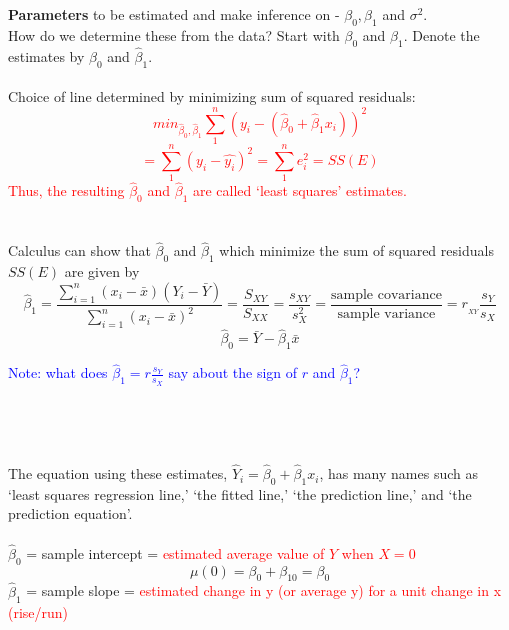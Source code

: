 \Large\textbf{Parameters} to be estimated and make inference on - $\beta_0, \beta_1$ and $\sigma^2$.\large\\
How do we determine these from the data?  Start with $\beta_0$ and $\beta_1$.  Denote the estimates by $\hat\beta_0$ and $\hat\beta_1$.\\~\\
Choice of line determined by minimizing sum of squared residuals:%
\textcolor{red}{$$min_{\hat\beta_0,\hat\beta_1}\sum_1^n \left(y_i- (\hat\beta_0 + \hat\beta_1 x_i)\right)^2$$
$$ = \sum_1^n (y_i-\hat{y_i})^2 = \sum_1^n e_i^2 = SS(E)$$
Thus, the resulting $\hat\beta_0$ and $\hat\beta_1$ are called `least squares' estimates.}\\~\\~\\
Calculus can show that $\hat\beta_0$ and $\hat\beta_1$ which minimize the sum of squared residuals $SS(E)$ are given by
$$\hat{\beta}_1=\frac{\sum_{i=1}^{n} (x_i-\bar{x})(Y_i-\bar{Y})}{\sum_{i=1}^{n} (x_i-\bar{x})^2}= \frac{S_{XY}}{S_{XX}} = \frac{s_{XY}}{s_X^2} = \frac{\mbox{sample covariance}}{\mbox{sample variance}} = r_{_{XY}} \frac{s_Y}{s_X}$$
$$\hat{\beta}_0=\bar{Y}-\hat{\beta}_1 \bar{x}$$

\textcolor{blue}{Note: what does $\hat{\beta}_1= r\frac{s_Y}{s_X} $ say about the sign of $r$ and $\hat{\beta}_1$?}\\~\\~\\~\\~\\

The equation using these estimates, $\hat{Y}_i=\hat\beta_0 + \hat\beta_1 x_i$, has many names such as `least squares regression line,' `the fitted line,' `the prediction line,' and `the prediction equation'.\\~\\
$\hat\beta_0$ = sample intercept = %
\textcolor{red}{estimated average value of $Y$ when $X = 0$}\\
$$\mu(0)=\beta_0+\beta_10=\beta_0$$
$\hat{\beta}_1$ = sample slope = %
\textcolor{red}{estimated change in y (or average y) for a unit change in x (rise/run)}\\

